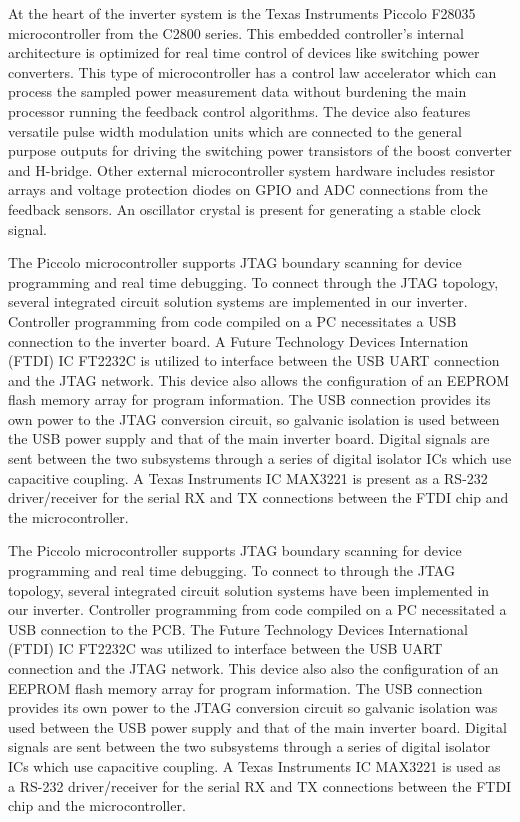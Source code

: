  At the heart of the inverter system is the Texas Instruments Piccolo F28035 microcontroller from the C2800 series. This embedded controller's internal architecture is optimized for real time control of devices like switching power converters. This type of microcontroller has a control law accelerator which can process the sampled power measurement data without burdening the main processor running the feedback control algorithms. The device also features versatile pulse width modulation units which are connected to the general purpose outputs for driving the switching power transistors of the boost converter and H-bridge. Other external microcontroller system hardware includes resistor arrays and voltage protection diodes on GPIO and ADC connections from the feedback sensors. An oscillator crystal is present for generating a stable clock signal.

The Piccolo microcontroller supports JTAG boundary scanning for device programming and real time debugging. To connect through the JTAG topology, several integrated circuit solution systems are implemented in our inverter. Controller programming from code compiled on a PC necessitates a USB connection to the inverter board. A Future Technology Devices Internation (FTDI) IC FT2232C is utilized to interface between the USB UART connection and the JTAG network. This device also allows the configuration of an EEPROM flash memory array for program information. The USB connection provides its own power to the JTAG conversion circuit, so galvanic isolation is used between the USB power supply and that of the main inverter board. Digital signals are sent between the two subsystems through a series of digital isolator ICs which use capacitive coupling. A Texas Instruments IC MAX3221 is present as a RS-232 driver/receiver for the serial RX and TX connections between the FTDI chip and the microcontroller.

The Piccolo microcontroller supports JTAG boundary scanning for device programming and real time debugging. To connect to through the JTAG topology, several integrated circuit solution systems have been implemented in our inverter. Controller programming from code compiled on a PC necessitated a USB connection to the PCB. The Future Technology Devices International (FTDI) IC FT2232C was utilized to interface between the USB UART connection and the JTAG network. This device also also the configuration of an EEPROM flash memory array for program information. The USB connection provides its own power to the JTAG conversion circuit so galvanic isolation was used between the USB power supply and that of the main inverter board. Digital signals are sent between the two subsystems through a series of digital isolator ICs which use capacitive coupling. A Texas Instruments IC MAX3221 is used as a RS-232 driver/receiver for the serial RX and TX connections between the FTDI chip and the microcontroller.  


